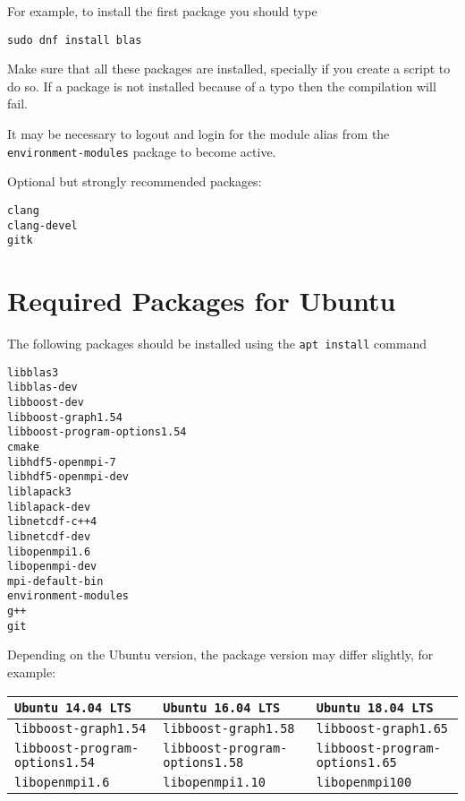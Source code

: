 \documentclass{article}
\begin{document}
For example, to install the first package you should type
\begin{verbatim}
sudo dnf install blas
\end{verbatim}

Make sure that all these packages are installed, specially if you
create a script to do so. If a package is not installed because of a
typo then the compilation will fail.

It may be necessary to logout and login for the module alias from the
\verb+environment-modules+ package to become active.

Optional but strongly recommended packages:
\begin{verbatim}
clang
clang-devel
gitk
\end{verbatim}

\section{Required Packages for Ubuntu}
The following packages should be installed using the \verb+apt install+
command
\begin{verbatim}
libblas3
libblas-dev
libboost-dev
libboost-graph1.54
libboost-program-options1.54
cmake
libhdf5-openmpi-7
libhdf5-openmpi-dev
liblapack3
liblapack-dev
libnetcdf-c++4
libnetcdf-dev
libopenmpi1.6
libopenmpi-dev
mpi-default-bin
environment-modules
g++
git
\end{verbatim}

Depending on the Ubuntu version, the package version may differ slightly, for
example:

\begin{table}[H]
  \begin{center}
    \begin{tabular}{l l l}
      \toprule
      \verb+Ubuntu 14.04 LTS+ &
      \verb+Ubuntu 16.04 LTS+ &
      \verb+Ubuntu 18.04 LTS+ \\
      \midrule
      \verb+libboost-graph1.54+ &
      \verb+libboost-graph1.58+ &
      \verb+libboost-graph1.65+ \\
      \verb+libboost-program-options1.54+ &
      \verb+libboost-program-options1.58+ &
      \verb+libboost-program-options1.65+ \\
      \verb+libopenmpi1.6+ &
      \verb+libopenmpi1.10+ &
      \verb+libopenmpi100+ \\
      \bottomrule
    \end{tabular}
  \end{center}
\end{table}
\end{document}
